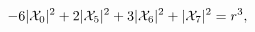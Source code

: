 \begin{equation}
\label{eq:Dconst1}
-6|{\cal X}_0|^2+2|{\cal X}_5|^2+3|{\cal X}_6|^2+|{\cal X}_7|^2=r^3,
\end{equation}

